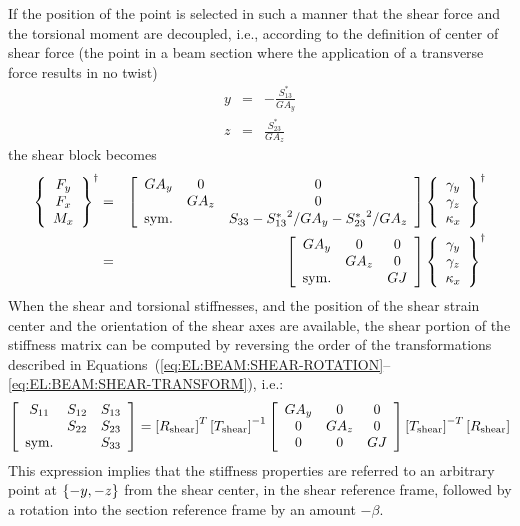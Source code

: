 If the position of the point is selected in such a manner 
that the shear force and the torsional moment are decoupled, i.e.,
according to the definition of center of shear force (the point 
in a beam section where the application of a transverse force
results in no twist)
\begin{eqnarray*}
	y & = & -\frac{S_{13}^*}{GA_y} \\
	z & = & \frac{S_{23}^*}{GA_z}
\end{eqnarray*}
the shear block becomes
\begin{eqnarray*}
	\cubr{\cvvect{
		F_y \\
		F_x \\
		M_x
	}}^{\dagger}
	& = &
	\sqbr{\matr{ccc}{
		GA_y & 0 & 0 \\
		& GA_z & 0 \\
		\llk{sym.} &  & S_{33} - {S_{13}^*}^2/GA_y - {S_{23}^*}^2/GA_z
	}}\cubr{\cvvect{
		\gamma_y \\
		\gamma_z \\
		\kappa_x
	}}^{\dagger}
	\\
	& = &
	\sqbr{\matr{ccc}{
		GA_y & 0 & 0 \\
		& GA_z & 0 \\
		\llk{sym.} &  & GJ
	}}\cubr{\cvvect{
		\gamma_y \\
		\gamma_z \\
		\kappa_x
	}}^{\dagger}
\end{eqnarray*}
When the shear and torsional stiffnesses, and the position 
of the shear strain center and the orientation of the shear axes
are available, the shear portion of the stiffness matrix 
can be computed by reversing the order of the transformations 
described in
Equations~(\ref{eq:EL:BEAM:SHEAR-ROTATION}--\ref{eq:EL:BEAM:SHEAR-TRANSFORM}),
i.e.:
\begin{equation}
	\sqbr{\matr{ccc}{
		S_{11} & S_{12} & S_{13} \\
		& S_{22} & S_{23} \\
		\llk{sym.} & & S_{33}
	}} = \sqbr{R_{\llk{shear}}}^T \sqbr{T_{\llk{shear}}}^{-1} \sqbr{\matr{ccc}{
		GA_y & 0 & 0 \\
		0 & GA_z & 0 \\
		0 & 0 & GJ
	}} \sqbr{T_{\llk{shear}}}^{-T} \sqbr{R_{\llk{shear}}}
	\label{eq:EL:BEAM:SHEAR-TRANSFORM-REVERSED}
\end{equation}
This expression implies that the stiffness properties are referred
to an arbitrary point at $\cubr{-y,-z}$ from the shear center,
in the shear reference frame, followed by a rotation
into the section reference frame by an amount $-\beta$.
